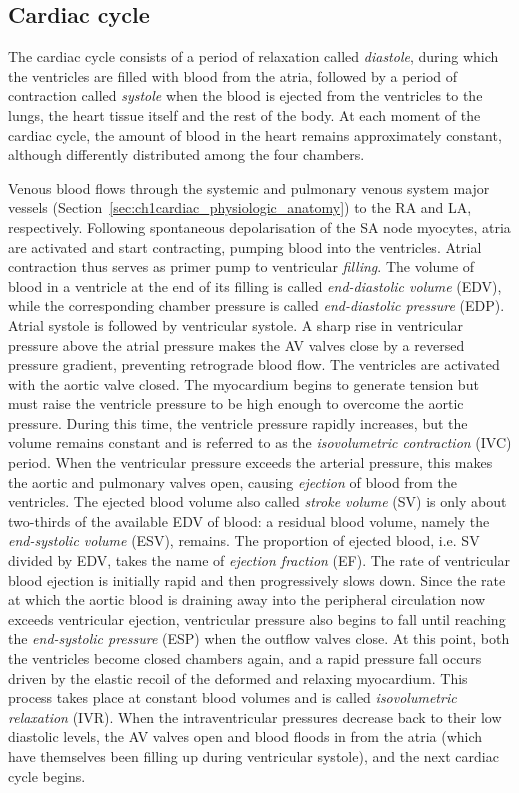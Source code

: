 %
%
%
\subsection{Cardiac cycle}\label{sec:ch1cardiac_cycle}
The cardiac cycle consists of a period of relaxation called \textit{diastole}, during which the ventricles are filled with blood from the atria, followed by a period of contraction called \textit{systole} when the blood is ejected from the ventricles to the lungs, the heart tissue itself and the rest of the body. At each moment of the cardiac cycle, the amount of blood in the heart remains approximately constant, although differently distributed among the four chambers.

\vspace{0.2cm}
Venous blood flows through the systemic and pulmonary venous system major vessels (Section~\ref{sec:ch1cardiac_physiologic_anatomy}) to the RA and LA, respectively. Following spontaneous depolarisation of the SA node myocytes, atria are activated and start contracting, pumping blood into the ventricles. Atrial contraction thus serves as primer pump to ventricular \textit{filling}. The volume of blood in a ventricle at the end of its filling is called \textit{end-diastolic volume} (\acs{EDV}), while the corresponding chamber pressure is called \textit{end-diastolic pressure} (\acs{EDP}). Atrial systole is followed by ventricular systole. A sharp rise in ventricular pressure above the atrial pressure makes the AV valves close by a reversed pressure gradient, preventing retrograde blood flow. The ventricles are activated with the aortic valve closed. The myocardium begins to generate tension but must raise the ventricle pressure to be high enough to overcome the aortic pressure. During this time, the ventricle pressure rapidly increases, but the volume remains constant and is referred to as the \textit{isovolumetric contraction} (\acs{IVC}) period. When the ventricular pressure exceeds the arterial pressure, this makes the aortic and pulmonary valves open, causing \textit{ejection} of blood from the ventricles. The ejected blood volume also called \textit{stroke volume} (\acs{SV}) is only about two-thirds of the available EDV of blood: a residual blood volume, namely the \textit{end-systolic volume} (\acs{ESV}), remains. The proportion of ejected blood, i.e. SV divided by EDV, takes the name of \textit{ejection fraction} (\acs{EF}). The rate of ventricular blood ejection is initially rapid and then progressively slows down. Since the rate at which the aortic blood is draining away into the peripheral circulation now exceeds ventricular ejection, ventricular pressure also begins to fall until reaching the \textit{end-systolic pressure} (\acs{ESP}) when the outflow valves close. At this point, both the ventricles become closed chambers again, and a rapid pressure fall occurs driven by the elastic recoil of the deformed and relaxing myocardium. This process takes place at constant blood volumes and is called \textit{isovolumetric relaxation} (\acs{IVR}). When the intraventricular pressures decrease back to their low diastolic levels, the AV valves open and blood floods in from the atria (which have themselves been filling up during ventricular systole), and the next cardiac cycle begins.

